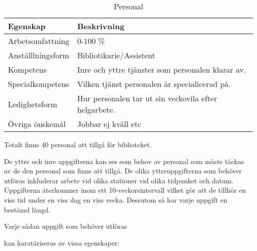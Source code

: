 \begin{table}
\caption{Personal}
\label{tab1}
\begin{tabular}[H]{|l|l|}
\hline 
\textbf{Egenskap} & \textbf{Beskrivning} \\ \hline
Arbetsomfattning & 0-100 \% 
\\ \hline 
Anställlningsform & Bibliotikarie/Assistent
\\ \hline 
Kompetens & Inre och yttre tjänster som personalen klarar av.  
\\ \hline 
Specialkompetens & Vilken tjänst personalen är specialicerad på.
\\ \hline 
Ledighetsform & Hur personalen tar ut sin veckovila efter helgarbete.
\\ \hline 
Övriga önskemål & Jobbar ej kväll etc
\\ \hline 
\end{tabular}
\end{table}

Totalt finns 40 personal att tillgå för biblioteket.

De yttre och inre uppgifterna kan ses som behov av personal som måste täckas av de den personal som finns att tillgå. De olika yttreuppgifterna som behöver utföras inkluderar arbete vid olika stationer vid olika tidpunket och datum. Uppgifterna återkommer inom ett 10-veckorsintervall vilket gör att de tillhör en viss tid under en viss dag en viss vecka. Dessutom så har varje uppgift en bestämd längd.   

Varje sådan uppgift som behöver utföras 

kan karatäriseras av vissa egenskaper: \\

